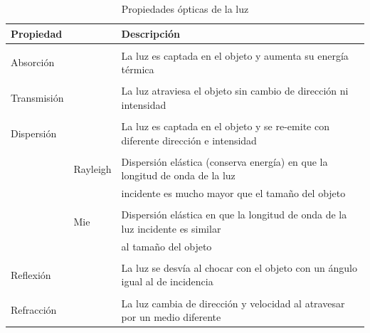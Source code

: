 \begin{table}[htb]
\centering
\tiny
\caption{Propiedades ópticas de la luz  \citep{Born&Wolf2003}}
\label{tab:propiedadesopticas}
\begin{tabular}{lll}
\hline
\textbf{Propiedad} &          & \textbf{Descripción}                             \\ \hline
                                    &          &                                                                         \\
Absorción                           &          & La luz es captada en el objeto y aumenta su energía térmica                       \\
                                    &          &                                                                                   \\
Transmisión                         &          & La luz atraviesa el objeto sin cambio de dirección ni intensidad                  \\
                                    &          &                                                                                   \\
Dispersión                          &          & La luz es captada en el objeto y se re-emite con diferente dirección e intensidad \\
                                    &          &                                                                                   \\
                                    & Rayleigh & Dispersión elástica (conserva energía) en que la longitud de onda de la luz       \\
                                    &          & incidente es mucho mayor que el tamaño del objeto                                 \\
                                    &          &                                                                                   \\
                                    & Mie      & Dispersión elástica en que la longitud de onda de la luz incidente es similar     \\
                                    &          & al tamaño del objeto                                                              \\
                                    &          &                                                                                   \\
Reflexión                           &          & La luz se desvía al chocar con el objeto con un ángulo igual al de incidencia     \\
                                    &          &                                                                                   \\
Refracción                          &          & La luz cambia de dirección y velocidad al atravesar por un medio diferente       
\end{tabular}
\end{table}

